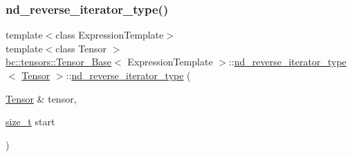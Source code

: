 \subsubsection{\texorpdfstring{nd\+\_\+reverse\+\_\+iterator\+\_\+type()}{nd\_reverse\_iterator\_type()}\hspace{0.1cm}{\footnotesize\ttfamily [2/3]}}
{\footnotesize\ttfamily template$<$class Expression\+Template$>$ \\
template$<$class Tensor $>$ \\
\hyperlink{classbc_1_1tensors_1_1Tensor__Base}{bc\+::tensors\+::\+Tensor\+\_\+\+Base}$<$ Expression\+Template $>$\+::\hyperlink{structbc_1_1tensors_1_1Tensor__Base_1_1nd__reverse__iterator__type}{nd\+\_\+reverse\+\_\+iterator\+\_\+type}$<$ \hyperlink{namespacebc_a659391e47ab612be3ba6c18cf9c89159}{Tensor} $>$\+::\hyperlink{structbc_1_1tensors_1_1Tensor__Base_1_1nd__reverse__iterator__type}{nd\+\_\+reverse\+\_\+iterator\+\_\+type} (\begin{DoxyParamCaption}\item[{\hyperlink{namespacebc_a659391e47ab612be3ba6c18cf9c89159}{Tensor} \&}]{tensor,  }\item[{\hyperlink{structbc_1_1tensors_1_1Tensor__Base_1_1nd__reverse__iterator__type_a7d4012a381490c1667a2fc0d6b7c0df4}{size\+\_\+t}}]{start }\end{DoxyParamCaption})\hspace{0.3cm}{\ttfamily [inline]}}

\mbox{\label{structbc_1_1tensors_1_1Tensor__Base_1_1nd__reverse__iterator__type_aa98255aca96f1cca1bbff6d95a3f4968}} 
